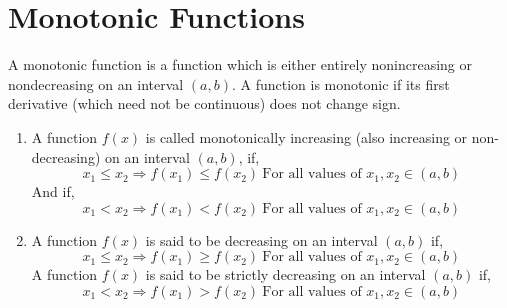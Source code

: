 \section{Monotonic Functions}
  A monotonic function is a function which is either entirely nonincreasing or nondecreasing on an interval $\left( a,b\right) $. A function is monotonic if its first derivative (which need not be continuous) does not change sign.
  \begin{enumerate}
  	\item A function  $f(x)$ is called monotonically increasing (also increasing or non-decreasing) on an interval $\left( a,b\right) $, if,
  	$$ x_{1}\leq x_{2} \Rightarrow  f\left( x_{1}\right) \leq f\left( x_{2}\right) \ \text{For all values of }  x_{1}, x_{2} \in \left( a,b\right)    $$
  	And if,
  	 $$ x_{1} < x_{2} \Rightarrow  f\left( x_{1}\right) < f\left( x_{2}\right) \ \text{For all values of }  x_{1}, x_{2} \in \left( a,b\right)    $$
  	\item 
  	A function $f(x)$ is said to be  decreasing on an interval $\left( a,b\right) $  if, 
  	$$ x_{1}\leq x_{2} \Rightarrow  f\left( x_{1}\right) \geq f\left( x_{2}\right) \ \text{For all values of }  x_{1}, x_{2} \in \left( a,b\right)    $$
  	 A function $f(x)$ is said to be strictly decreasing on an interval $\left( a,b\right) $  if,
  	 	$$ x_{1}< x_{2} \Rightarrow  f\left( x_{1}\right) > f\left( x_{2}\right) \ \text{For all values of }  x_{1}, x_{2} \in \left( a,b\right)    $$
  \end{enumerate}

